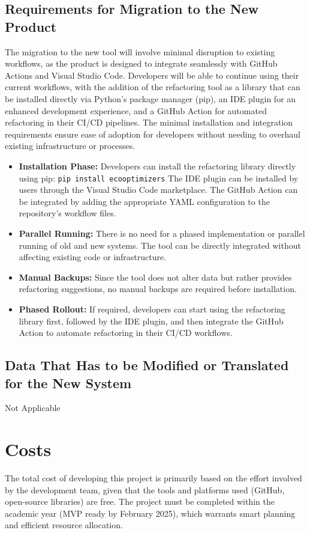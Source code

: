 \documentclass[12pt]{article}
\begin{document}
\subsection{Requirements for Migration to the New Product}
The migration to the new tool will involve minimal disruption to existing workflows, as the product is designed to integrate seamlessly with GitHub Actions and Visual Studio Code. Developers will be able to continue using their current workflows, with the addition of the refactoring tool as a library that can be installed directly via Python's package manager (pip), an IDE plugin for an enhanced development experience, and a GitHub Action for automated refactoring in their CI/CD pipelines. The minimal installation and integration requirements ensure ease of adoption for developers without needing to overhaul existing infrastructure or processes.
\begin{itemize}
    \item \textbf{Installation Phase:} 
    Developers can install the refactoring library directly using pip:
    \verb|pip install ecooptimizers|
    The IDE plugin can be installed by users through the Visual Studio Code marketplace. The GitHub Action can be integrated by adding the appropriate YAML configuration to the repository's workflow files.
    \item \textbf{Parallel Running:} 
    There is no need for a phased implementation or parallel running of old and new systems. The tool can be directly integrated without affecting existing code or infrastructure.
    \item \textbf{Manual Backups:} 
    Since the tool does not alter data but rather provides refactoring suggestions, no manual backups are required before installation.
    \item \textbf{Phased Rollout:} 
    If required, developers can start using the refactoring library first, followed by the IDE plugin, and then integrate the GitHub Action to automate refactoring in their CI/CD workflows.
\end{itemize}
\subsection{Data That Has to be Modified or Translated for the New System}
Not Applicable

\section{Costs}
The total cost of developing this project is primarily based on the effort involved by the development team, given that the tools and platforms used (GitHub, open-source libraries) are free. The project must be completed within the academic year (MVP ready by February 2025), which warrants smart planning and efficient resource allocation.
\end{document}
